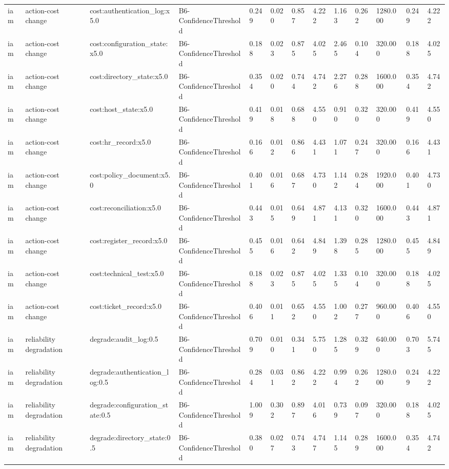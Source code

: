 \begin{table}[!ht]
{\begin{tabular}{lllllllllllll}
iam & action-cost change & cost:authentication\_log:x5.0 & B6-ConfidenceThreshold & 0.249 & 0.020 & 0.857 & 4.222 & 1.163 & 0.262 & 1280.000 & 0.249 & 4.222 \\
iam & action-cost change & cost:configuration\_state:x5.0 & B6-ConfidenceThreshold & 0.188 & 0.023 & 0.875 & 4.025 & 2.465 & 0.104 & 320.000 & 0.188 & 4.025 \\
iam & action-cost change & cost:directory\_state:x5.0 & B6-ConfidenceThreshold & 0.354 & 0.020 & 0.744 & 4.742 & 2.276 & 0.288 & 1600.000 & 0.354 & 4.742 \\
iam & action-cost change & cost:host\_state:x5.0 & B6-ConfidenceThreshold & 0.419 & 0.018 & 0.688 & 4.550 & 0.910 & 0.320 & 320.000 & 0.419 & 4.550 \\
iam & action-cost change & cost:hr\_record:x5.0 & B6-ConfidenceThreshold & 0.166 & 0.012 & 0.866 & 4.431 & 1.071 & 0.247 & 320.000 & 0.166 & 4.431 \\
iam & action-cost change & cost:policy\_document:x5.0 & B6-ConfidenceThreshold & 0.401 & 0.016 & 0.687 & 4.730 & 1.142 & 0.284 & 1920.000 & 0.401 & 4.730 \\
iam & action-cost change & cost:reconciliation:x5.0 & B6-ConfidenceThreshold & 0.443 & 0.015 & 0.649 & 4.871 & 4.131 & 0.320 & 1600.000 & 0.443 & 4.871 \\
iam & action-cost change & cost:register\_record:x5.0 & B6-ConfidenceThreshold & 0.455 & 0.016 & 0.642 & 4.849 & 1.398 & 0.285 & 1280.000 & 0.455 & 4.849 \\
iam & action-cost change & cost:technical\_test:x5.0 & B6-ConfidenceThreshold & 0.188 & 0.023 & 0.875 & 4.025 & 1.335 & 0.104 & 320.000 & 0.188 & 4.025 \\
iam & action-cost change & cost:ticket\_record:x5.0 & B6-ConfidenceThreshold & 0.406 & 0.011 & 0.652 & 4.550 & 1.002 & 0.277 & 960.000 & 0.406 & 4.550 \\
iam & reliability degradation & degrade:audit\_log:0.5 & B6-ConfidenceThreshold & 0.709 & 0.010 & 0.341 & 5.750 & 1.285 & 0.329 & 640.000 & 0.703 & 5.745 \\
iam & reliability degradation & degrade:authentication\_log:0.5 & B6-ConfidenceThreshold & 0.284 & 0.031 & 0.862 & 4.222 & 0.994 & 0.262 & 1280.000 & 0.249 & 4.222 \\
iam & reliability degradation & degrade:configuration\_state:0.5 & B6-ConfidenceThreshold & 1.009 & 0.302 & 0.897 & 4.016 & 0.739 & 0.097 & 320.000 & 0.188 & 4.025 \\
iam & reliability degradation & degrade:directory\_state:0.5 & B6-ConfidenceThreshold & 0.380 & 0.027 & 0.743 & 4.747 & 1.145 & 0.289 & 1600.000 & 0.354 & 4.742 \\

\end{tabular}}
\end{table}

